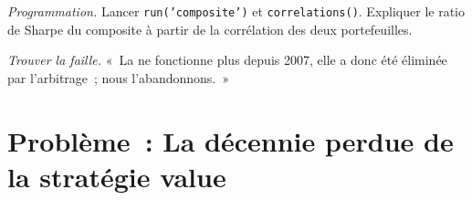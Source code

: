 \begin{exercise}[$\star\star\star$]\label{exo:s1:value-quality-and-low-risk:7}
\emph{Programmation.} Lancer \texttt{run('composite')} et \texttt{correlations()}. Expliquer le ratio de Sharpe du composite à partir de la corrélation des deux portefeuilles.
\end{exercise}

\begin{exercise}[$\star\star\star$]\label{exo:s1:value-quality-and-low-risk:8}
\emph{Trouver la faille.} «~La  ne fonctionne plus depuis 2007, elle a donc été éliminée par l'arbitrage~; nous l'abandonnons.~»
\end{exercise}

\section{Problème~: La décennie perdue de la stratégie value}


